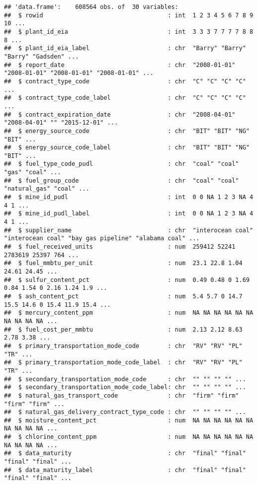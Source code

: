 \documentclass[
]{article}
\begin{document}
\begin{verbatim}
## 'data.frame':    608564 obs. of  30 variables:
##  $ rowid                                   : int  1 2 3 4 5 6 7 8 9 10 ...
##  $ plant_id_eia                            : int  3 3 3 7 7 7 7 8 8 8 ...
##  $ plant_id_eia_label                      : chr  "Barry" "Barry" "Barry" "Gadsden" ...
##  $ report_date                             : chr  "2008-01-01" "2008-01-01" "2008-01-01" "2008-01-01" ...
##  $ contract_type_code                      : chr  "C" "C" "C" "C" ...
##  $ contract_type_code_label                : chr  "C" "C" "C" "C" ...
##  $ contract_expiration_date                : chr  "2008-04-01" "2008-04-01" "" "2015-12-01" ...
##  $ energy_source_code                      : chr  "BIT" "BIT" "NG" "BIT" ...
##  $ energy_source_code_label                : chr  "BIT" "BIT" "NG" "BIT" ...
##  $ fuel_type_code_pudl                     : chr  "coal" "coal" "gas" "coal" ...
##  $ fuel_group_code                         : chr  "coal" "coal" "natural_gas" "coal" ...
##  $ mine_id_pudl                            : int  0 0 NA 1 2 3 NA 4 4 1 ...
##  $ mine_id_pudl_label                      : int  0 0 NA 1 2 3 NA 4 4 1 ...
##  $ supplier_name                           : chr  "interocean coal" "interocean coal" "bay gas pipeline" "alabama coal" ...
##  $ fuel_received_units                     : num  259412 52241 2783619 25397 764 ...
##  $ fuel_mmbtu_per_unit                     : num  23.1 22.8 1.04 24.61 24.45 ...
##  $ sulfur_content_pct                      : num  0.49 0.48 0 1.69 0.84 1.54 0 2.16 1.24 1.9 ...
##  $ ash_content_pct                         : num  5.4 5.7 0 14.7 15.5 14.6 0 15.4 11.9 15.4 ...
##  $ mercury_content_ppm                     : num  NA NA NA NA NA NA NA NA NA NA ...
##  $ fuel_cost_per_mmbtu                     : num  2.13 2.12 8.63 2.78 3.38 ...
##  $ primary_transportation_mode_code        : chr  "RV" "RV" "PL" "TR" ...
##  $ primary_transportation_mode_code_label  : chr  "RV" "RV" "PL" "TR" ...
##  $ secondary_transportation_mode_code      : chr  "" "" "" "" ...
##  $ secondary_transportation_mode_code_label: chr  "" "" "" "" ...
##  $ natural_gas_transport_code              : chr  "firm" "firm" "firm" "firm" ...
##  $ natural_gas_delivery_contract_type_code : chr  "" "" "" "" ...
##  $ moisture_content_pct                    : num  NA NA NA NA NA NA NA NA NA NA ...
##  $ chlorine_content_ppm                    : num  NA NA NA NA NA NA NA NA NA NA ...
##  $ data_maturity                           : chr  "final" "final" "final" "final" ...
##  $ data_maturity_label                     : chr  "final" "final" "final" "final" ...
\end{verbatim}
\end{document}
